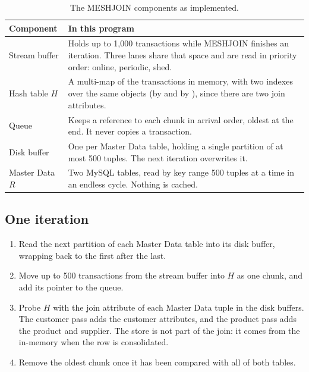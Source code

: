 \documentclass[11pt,a4paper]{article}
\newcommand{\code}[1]{\texttt{\detokenize{#1}}}
\begin{document}
\begin{table}[ht]
  \centering
  \caption{The MESHJOIN components as implemented.}
  \begin{tabular}{@{}>{\raggedright\arraybackslash}p{3.0cm}>{\raggedright\arraybackslash}p{11.8cm}@{}}
    \toprule
    Component & In this program \\
    \midrule
    Stream buffer & Holds up to 1,000 transactions while MESHJOIN finishes an iteration. Three lanes share that space and are read in priority order: online, periodic, shed. \\
    Hash table $H$ & A multi-map of the transactions in memory, with two indexes over the same objects (by \code{customer_id} and by \code{product_id}), since there are two join attributes. \\
    Queue & Keeps a reference to each chunk in arrival order, oldest at the end. It never copies a transaction. \\
    Disk buffer & One per Master Data table, holding a single partition of at most 500 tuples. The next iteration overwrites it. \\
    Master Data $R$ & Two MySQL tables, read by key range 500 tuples at a time in an endless cycle. Nothing is cached. \\
    \bottomrule
  \end{tabular}
\end{table}

\subsection{One iteration}

\begin{enumerate}
  \item Read the next partition of each Master Data table into its disk buffer, wrapping back to the first after the last.
  \item Move up to 500 transactions from the stream buffer into $H$ as one chunk, and add its pointer to the queue.
  \item Probe $H$ with the join attribute of each Master Data tuple in the disk buffers. The customer pass adds the customer attributes, and the product pass adds the product and supplier. The store is not part of the join: it comes from the in-memory \code{Store_list} when the row is consolidated.
  \item Remove the oldest chunk once it has been compared with all of both tables.
\end{enumerate}
\end{document}
